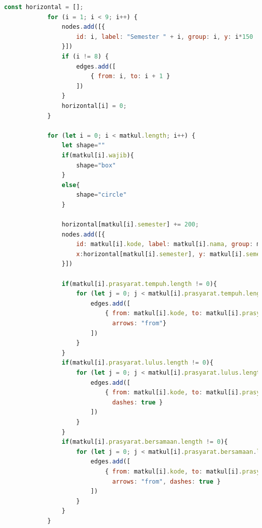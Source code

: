 \begin{itemize}
\begin{itemize}
\begin{itemize}
            \begin{lstlisting}[language=JavaScript, caption=Kode untuk membuat Visualisasi Network\label{lst:kodeMembuatNetwork}]
            const horizontal = [];
            for (i = 1; i < 9; i++) {
                nodes.add([{
                    id: i, label: "Semester " + i, group: i, y: i*150
                }])
                if (i != 8) {
                    edges.add([
                        { from: i, to: i + 1 }
                    ])
                }
                horizontal[i] = 0;
            }
            
            for (let i = 0; i < matkul.length; i++) {
                let shape=""
                if(matkul[i].wajib){
                    shape="box"
                }
                else{
                    shape="circle"
                }
    
                horizontal[matkul[i].semester] += 200; 
                nodes.add([{
                    id: matkul[i].kode, label: matkul[i].nama, group: matkul[i].semester, 
                    x:horizontal[matkul[i].semester], y: matkul[i].semester*150, shape:shape 
                }])
    
                if(matkul[i].prasyarat.tempuh.length != 0){
                    for (let j = 0; j < matkul[i].prasyarat.tempuh.length; j++){
                        edges.add([
                            { from: matkul[i].kode, to: matkul[i].prasyarat.tempuh[j], 
                              arrows: "from"}
                        ])
                    }
                }
                if(matkul[i].prasyarat.lulus.length != 0){
                    for (let j = 0; j < matkul[i].prasyarat.lulus.length; j++){
                        edges.add([
                            { from: matkul[i].kode, to: matkul[i].prasyarat.lulus[j], 
                              dashes: true }
                        ])
                    }
                }
                if(matkul[i].prasyarat.bersamaan.length != 0){
                    for (let j = 0; j < matkul[i].prasyarat.bersamaan.length; j++){
                        edges.add([
                            { from: matkul[i].kode, to: matkul[i].prasyarat.bersamaan[j], 
                              arrows: "from", dashes: true }
                        ])
                    }
                }
            }
            \end{lstlisting}
            
        \end{itemize}
    \end{itemize}


\end{itemize}
